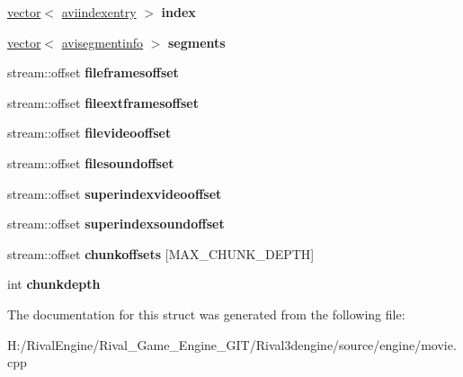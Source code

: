\begin{DoxyCompactItemize}
\mbox{\label{structaviwriter_a0cd93177be03758eb325ea4f9d7b5307}} 
\hyperlink{structvector}{vector}$<$ \hyperlink{structaviindexentry}{aviindexentry} $>$ {\bfseries index}
\item 
\mbox{\label{structaviwriter_a542bd506829bc629dac42ef0624c7ece}} 
\hyperlink{structvector}{vector}$<$ \hyperlink{structavisegmentinfo}{avisegmentinfo} $>$ {\bfseries segments}
\item 
\mbox{\label{structaviwriter_ace727046657df3927b4e168de7dc0e2d}} 
stream\+::offset {\bfseries fileframesoffset}
\item 
\mbox{\label{structaviwriter_ad1a574e8986c741060963571e429455f}} 
stream\+::offset {\bfseries fileextframesoffset}
\item 
\mbox{\label{structaviwriter_a28518b6becc8c98418f391e1f9645095}} 
stream\+::offset {\bfseries filevideooffset}
\item 
\mbox{\label{structaviwriter_a7869e5609d1aa743cdb52c69a88b8a32}} 
stream\+::offset {\bfseries filesoundoffset}
\item 
\mbox{\label{structaviwriter_a41aec634e34374105e7149ed3cb889b5}} 
stream\+::offset {\bfseries superindexvideooffset}
\item 
\mbox{\label{structaviwriter_abc90ce28d6e2ad434f57b599abc44f69}} 
stream\+::offset {\bfseries superindexsoundoffset}
\item 
\mbox{\label{structaviwriter_a4660bf93eee6e67291aeeb93ea85b9dc}} 
stream\+::offset {\bfseries chunkoffsets} \mbox{[}M\+A\+X\+\_\+\+C\+H\+U\+N\+K\+\_\+\+D\+E\+P\+TH\mbox{]}
\item 
\mbox{\label{structaviwriter_a0f2fd32486c25d1d77e742de29648cf5}} 
int {\bfseries chunkdepth}
\end{DoxyCompactItemize}


The documentation for this struct was generated from the following file\+:\begin{DoxyCompactItemize}
\item 
H\+:/\+Rival\+Engine/\+Rival\+\_\+\+Game\+\_\+\+Engine\+\_\+\+G\+I\+T/\+Rival3dengine/source/engine/movie.\+cpp\end{DoxyCompactItemize}
